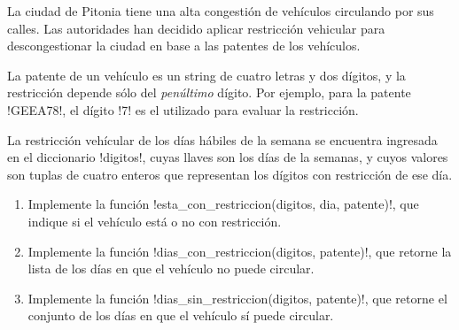 La ciudad de Pitonia tiene una alta congestión de vehículos
circulando por sus calles.
Las autoridades han decidido aplicar restricción vehicular
para descongestionar la ciudad en base a las patentes de los vehículos.

La patente de un vehículo es un string de cuatro letras y dos dígitos,
y la restricción depende sólo del \emph{penúltimo} dígito.
Por ejemplo, para la patente \li!GEEA78!,
el dígito \li!7! es el utilizado para evaluar la restricción.

La restricción vehícular de los días hábiles de la semana
se encuentra ingresada en el diccionario \li!digitos!,
cuyas llaves son los días de la semanas,
y cuyos valores son tuplas de cuatro enteros que representan
los dígitos con restricción de ese día.
\begin{enumerate}
  \item Implemente la función \li!esta_con_restriccion(digitos, dia, patente)!,
    que indique si el vehículo está o no con restricción.
  \item Implemente la función \li!dias_con_restriccion(digitos, patente)!,
    que retorne la lista de los días en que el vehículo no puede circular.
  \item Implemente la función \li!dias_sin_restriccion(digitos, patente)!,
    que retorne el conjunto de los días en que el vehículo sí puede circular.
\end{enumerate}


